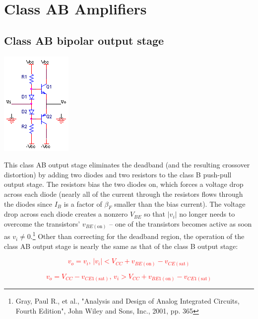 
\section{Class AB Amplifiers}

\subsection{Class AB bipolar output stage}
\begin{center}
	\includegraphics{schematics/classABoutput.PNG}
\end{center}
This class AB output stage eliminates the deadband (and the resulting crossover distortion) by adding two diodes and two resistors to the class B push-pull output stage. The resistors bias the two diodes on, which forces a voltage drop across each diode (nearly all of the current through the resistors flows through the diodes since $I_{B}$ is a factor of $\beta_{F}$ smaller than the bias current). The voltage drop across each diode creates a nonzero $V_{BE}$ so that $|v_{i}|$ no longer needs to overcome the transistors' $v_{BE(\text{on})}$ -- one of the transistors becomes active as soon as $v_{i} \neq 0$.\footnote{Gray, Paul R., et al., "Analysis and Design of Analog Integrated Circuits, Fourth Edition", John Wiley and Sons, Inc., 2001, pp. 365} Other than correcting for the deadband region, the operation of the class AB output stage is nearly the same as that of the class B output stage:

\textcolor{red}{
\begin{equation}
v_{o} = v_{i}\text{, }|v_{i}| < V_{CC} + v_{BE(\text{on})}-v_{CE(\text{sat})}
\end{equation}
}

\textcolor{red}{
\begin{equation}
v_{o} = V_{CC}-v_{CE1(\text{sat})}\text{, }v_{i} > V_{CC} + v_{BE1(\text{on})} - v_{CE1(\text{sat})}
\end{equation}
}

